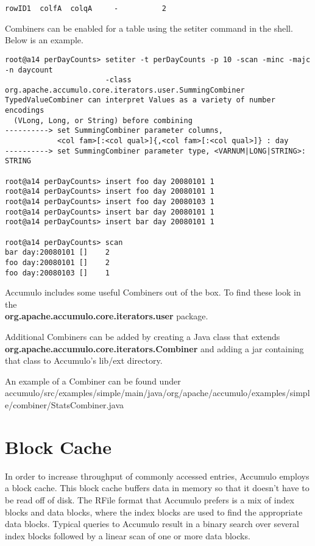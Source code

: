 \small
\begin{verbatim}
rowID1  colfA  colqA     -          2
\end{verbatim}
\normalsize

Combiners can be enabled for a table using the setiter command in the shell.  Below is an example.

\small
\begin{verbatim}
root@a14 perDayCounts> setiter -t perDayCounts -p 10 -scan -minc -majc -n daycount 
                       -class org.apache.accumulo.core.iterators.user.SummingCombiner
TypedValueCombiner can interpret Values as a variety of number encodings 
  (VLong, Long, or String) before combining
----------> set SummingCombiner parameter columns, 
            <col fam>[:<col qual>]{,<col fam>[:<col qual>]} : day
----------> set SummingCombiner parameter type, <VARNUM|LONG|STRING>: STRING

root@a14 perDayCounts> insert foo day 20080101 1
root@a14 perDayCounts> insert foo day 20080101 1
root@a14 perDayCounts> insert foo day 20080103 1
root@a14 perDayCounts> insert bar day 20080101 1
root@a14 perDayCounts> insert bar day 20080101 1

root@a14 perDayCounts> scan
bar day:20080101 []    2
foo day:20080101 []    2
foo day:20080103 []    1
\end{verbatim}
\normalsize

Accumulo includes some useful Combiners out of the box.  To find these look in
the\\ \textbf{org.apache.accumulo.core.iterators.user} package.

Additional Combiners can be added by creating a Java class that extends\\
\textbf{org.apache.accumulo.core.iterators.Combiner} and adding a jar containing that
class to Accumulo's lib/ext directory.

An example of a Combiner can be found under\\
accumulo/src/examples/simple/main/java/org/apache/accumulo/examples/simple/combiner/StatsCombiner.java


\section{Block Cache}

In order to increase throughput of commonly accessed entries, Accumulo employs a block cache.
This block cache buffers data in memory so that it doesn't have to be read off of disk.
The RFile format that Accumulo prefers is a mix of index blocks and data blocks, where the index blocks are used to find the appropriate data blocks.
Typical queries to Accumulo result in a binary search over several index blocks followed by a linear scan of one or more data blocks.

